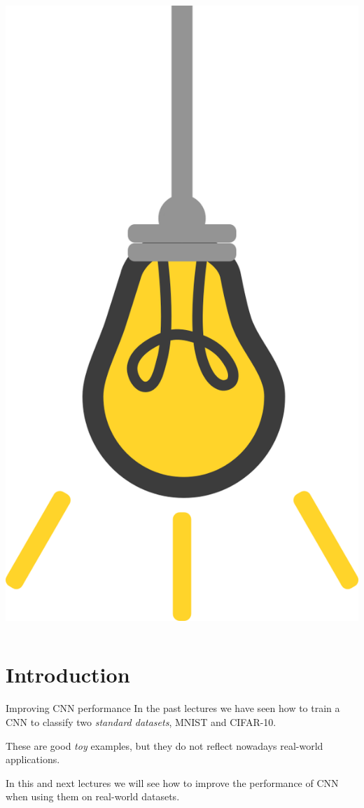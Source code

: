 \documentclass[9pt, aspectratio=169]{beamer}
\begin{document}
\begin{frame}
\begin{columns}
\begin{column}{0.2\textwidth}
            \includegraphics[angle=-30, origin=tr, width=1.5\textwidth]{lightbulb.png}
        \end{column}
    \end{columns}
\end{frame}

\section{Introduction}

\begin{frame}
    {Improving CNN performance}
    In the past lectures we have seen how to train a CNN to classify two \textit{standard datasets}, MNIST and CIFAR-10.

    These are good \textit{toy} examples, but they do not reflect nowadays real-world applications.

    In this and next lectures we will see how to improve the performance of CNN when using them on real-world datasets.
\end{frame}
\end{document}

